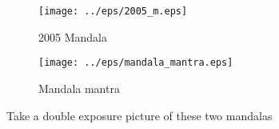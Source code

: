 \begin{figure}[h!] 
\begin{center}
\texttt{[image: ../eps/2005\_m.eps]}
\caption{2005 Mandala}
\label{label}
\end{center}
\end{figure}


\begin{figure}[htbp]
\begin{center}
\texttt{[image: ../eps/mandala\_mantra.eps]}
\caption{Mandala mantra}
\label{label}
\end{center}
\end{figure}


Take a double exposure picture of these two mandalas

